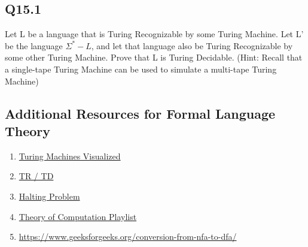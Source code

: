 \documentclass{article}
\begin{document}
\subsection*{Q15.1}
Let L be a language that is Turing Recognizable by some Turing Machine. Let L' be the language $\Sigma^* - L$,
and let that language also be Turing Recognizable by some other Turing Machine. Prove that L is Turing Decidable.
(Hint: Recall that a single-tape Turing Machine can be used to simulate a multi-tape Turing Machine)
\newpage

\subsection*{Additional Resources for Formal Language Theory}
\begin{enumerate}
    \item \href{https://www.youtube.com/watch?v=-ZS_zFg4w5k}{Turing Machines Visualized}
    \item \href{https://www.youtube.com/watch?v=sNWC1Zz6qcg}{TR / TD}
    \item \href{https://www.youtube.com/watch?v=VyHbd6sx5Po}{Halting Problem}
    \item \href{https://www.youtube.com/watch?v=SV57Yv8BXBc&list=PLhqug0UEsC-IDomfNsn8e3neoy34o8oye}{Theory of Computation Playlist}
	\item \url{https://www.geeksforgeeks.org/conversion-from-nfa-to-dfa/}
\end{enumerate}
\end{document}
